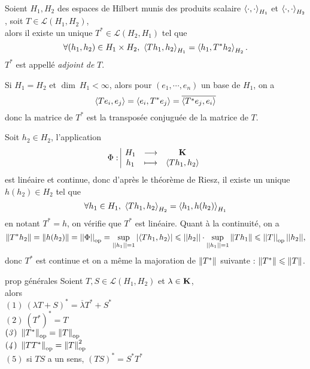 \documentclass[a4paper,11pt, twoside]{article}
\begin{document}
\newpage



\begin{corollaire}
  Soient $H_1,H_2$ des espaces de Hilbert munis des produits scalaire $\left\langle \cdot,\cdot \right\rangle_{H_1}$ et $\left\langle \cdot,\cdot \right\rangle_{H_2}$, soit $T\in\mathcal L(H_1,H_2)$,\\

  alors il existe un unique $T^*\in \mathcal L(H_2,H_1)$ tel que 
  $$\forall (h_1,h_2)\in H_1\times H_2,\ \left\langle Th_1,h_2 \right\rangle_{H_1}=\left\langle h_1,T^*h_2 \right\rangle_{H_2}.$$
  $T^*$ est appellé \emph{adjoint de }$T$.
\end{corollaire}


\begin{RQ}
  Si $H_1=H_2$ et $\dim\ H_1<\infty$, alors pour $(e_1,\cdots,e_n)$ un base de $H_1$, on a 
  $$\left\langle Te_i,e_j \right\rangle=\left\langle e_i,T^*e_j \right\rangle=\overline{\left\langle T^*e_j,e_i \right\rangle}$$
  donc la matrice de $T^*$ est la transposée conjuguée de la matrice de $T$. 
\end{RQ}


\begin{Proof}
  Soit $h_2\in H_2$, l'application
  $$\Phi:\begin{array}{|ccc}
    H_1&\longrightarrow&\mathbf K\\
    h_1&\longmapsto&\left\langle Th_1,h_2 \right\rangle
  \end{array}$$
  est linéaire et continue, donc d'après le théorème de Riesz, il existe un unique $h(h_2)\in H_2$ tel que 
  $$\forall h_1\in H_1,\ \ps{Th_1,h_2}_{H_2}=\ps{h_1,h(h_2)}_{H_1}$$
  en notant $T^*=h$, on vérifie que $T^*$ est linéaire. Quant à la continuité, on a 
  $$\left\lVert T^*h_2\right\rVert=\left\lVert h(h_2)\right\rVert=\left|\left|\Phi\right|\right|_{\mathrm{op}}=\underset{||h_1||=1}{\mathrm{sup}}\left| \left\langle Th_1,h_2 \right\rangle\right|\leqslant ||h_2||\cdot\underset{||h_1||=1}{\mathrm{sup}}\left\lVert Th_1\right\rVert\leqslant \left|\left|T\right|\right|_{\mathrm{op}}||h_2||,$$
  donc $T^*$ est continue et on a même la majoration de $\left\lVert T^*\right\rVert$ suivante : $\left\lVert T^*\right\rVert\leqslant \left\lVert T\right\rVert$.
\end{Proof}


\begin{propC}{prop générales}
  Soient $T,S\in\mathcal L(H_1,H_2)$ et $\lambda\in\mathbf K$,\\
 
  alors\\
  $(\mathit 1)\ \left(\lambda T+ S\right)^*=\overline{\lambda}T^*+S^*$\\
  $(\mathit 2)\ \left(T^*\right)^*=T$\\
  $(\mathit 3)\ \norm{T^*}_{\mathrm{op}}=\norm{T}_{\mathrm{op}}$\\
  $(\mathit 4)\  \left\lVert TT^*\right\rVert_{\mathrm{op}}=\left\lVert T\right\rVert_{\mathrm{op}}^2$\\
  $(\mathit 5)$ si $TS$ a un sens, $\left(TS\right)^*=S^*T^*$
\end{propC}
\end{document}
